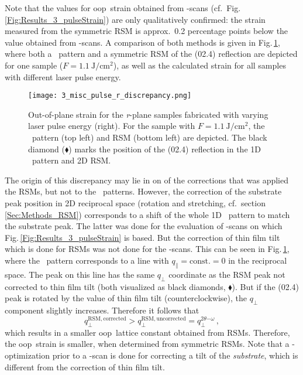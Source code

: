 Note that the values for \gls{oop}\ strain obtained from \thetaomega-scans (cf.\ Fig.\,\ref{Fig:Results_3_pulseStrain}) are only qualitatively confirmed:
the strain measured from the symmetric \gls{RSM} is approx.\ 0.2 percentage points below the value obtained from \thetaomega-scans.
A comparison of both methods is given in Fig.\,\ref{Fig:Results_3_r_strainDiscrepancy}, where both a \thetaomega\ pattern and a symmetric \acrshort{RSM} of the (02.4) reflection are depicted for one sample ($F=\qty{1.1}{\J\per\cm\squared}$), as well as the calculated strain for all samples with different laser pulse energy.
\begin{figure}[ht]
    \centering
    \texttt{[image: 3\_misc\_pulse\_r\_discrepancy.png]}
    \caption{
        Out-of-plane strain for the \textit{r}-plane samples fabricated with varying laser pulse energy (right).
        For the sample with $F=\qty{1.1}{\J\per\cm\squared}$, the \thetaomega\ pattern (top left) and \gls{RSM} (bottom left) are depicted.
        The black diamond ($\blacklozenge$) marks the position of the (02.4) reflection in the 1D \thetaomega\ pattern and 2D \gls{RSM}.
    }
    \label{Fig:Results_3_r_strainDiscrepancy}
\end{figure}
The origin of this discrepancy may lie in on of the corrections that was applied the \glspl{RSM}, but not to the \thetaomega\ patterns.
However, the correction of the substrate peak position in 2D reciprocal space (rotation and stretching, cf.\ section \ref{Sec:Methods_RSM}) corresponds to a shift of the whole 1D \thetaomega\ pattern to match the substrate peak.
The latter was done for the evaluation of \thetaomega-scans on which Fig.\,\ref{Fig:Results_3_pulseStrain} is based.
But the correction of thin film tilt which is done for \glspl{RSM} was not done for the \thetaomega-scans.
This can be seen in Fig.\,\ref{Fig:Results_3_r_strainDiscrepancy}, where the \thetaomega\ pattern corresponds to a line with $q_\parallel=\mathrm{const.}=0$ in the reciprocal space.
The peak on this line has the same $q_\perp$ coordinate as the RSM peak not corrected to thin film tilt (both visualized as black diamonds, $\blacklozenge$).
But if the (02.4) peak is rotated by the value of thin film tilt (counterclockwise), the $q_\perp$ component slightly increases.
Therefore it follows that
$$q_\perp^\mathrm{RSM, corrected}
>q_\perp^\mathrm{RSM, uncorrected}
=q_\perp^{2\theta\mathrm{-}\omega}\,,$$
which results in a smaller \gls{oop}\ lattice constant obtained from RSMs.
Therefore, the \gls{oop}\ strain is smaller, when determined from symmetric RSMs.
Note that a \textomega-optimization prior to a \thetaomega-scan is done for correcting a tilt of the \textit{substrate}, which is different from the correction of thin film tilt.

